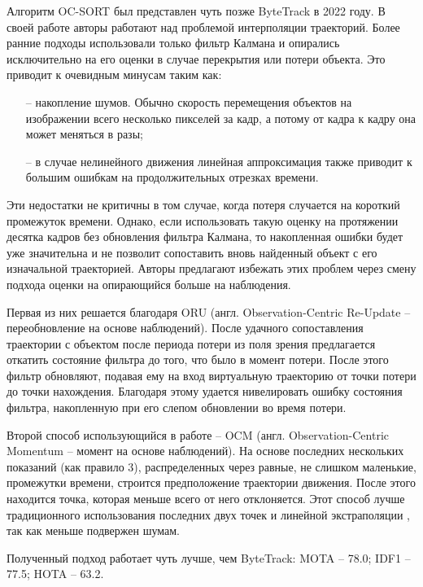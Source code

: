 Алгоритм OC-SORT \cite{cao2023observation} был представлен чуть позже ByteTrack в 2022 году. 
В своей работе авторы работают над проблемой интерполяции траекторий. Более ранние подходы использовали только фильтр Калмана и опирались исключительно на его оценки в случае перекрытия или потери объекта. 
Это приводит к очевидным минусам таким как: 
\begin{itemize}
    \item[--] накопление шумов. Обычно скорость перемещения объектов на изображении всего несколько пикселей за кадр, а потому от кадра к кадру она может меняться в разы;
    \item[--] в случае нелинейного движения линейная аппроксимация также приводит к большим ошибкам на продолжительных отрезках времени.
\end{itemize}
Эти недостатки не критичны в том случае, когда потеря случается на короткий промежуток времени. Однако, если использовать такую оценку на протяжении десятка кадров без обновления фильтра Калмана, то накопленная ошибки будет уже значительна и не позволит сопоставить вновь найденный объект с его изначальной траекторией.
Авторы предлагают избежать этих проблем через смену подхода оценки на опирающийся больше на наблюдения. 

Первая из них решается благодаря ORU (англ. Observation-Centric Re-Update -- переобновление на основе наблюдений). После удачного сопоставления траектории с объектом после периода потери из поля зрения предлагается откатить состояние фильтра до того, что было в момент потери. После этого фильтр обновляют, подавая ему на вход виртуальную траекторию от точки потери до точки нахождения. Благодаря этому удается нивелировать ошибку состояния фильтра, накопленную при его слепом обновлении во время потери.

Второй способ использующийся в работе -- OCM (англ. Observation-Centric Momentum -- момент на основе наблюдений). На основе последних нескольких показаний (как правило 3), распределенных через равные, не слишком маленькие, промежутки времени, строится предположение траектории движения. После этого находится точка, которая меньше всего от него отклоняется. Этот способ лучше традиционного использования последних двух точек и линейной экстраполяции , так как меньше подвержен шумам. 

Полученный подход работает чуть лучше, чем ByteTrack: MOTA -- 78.0; IDF1 -- 77.5; HOTA -- 63.2.